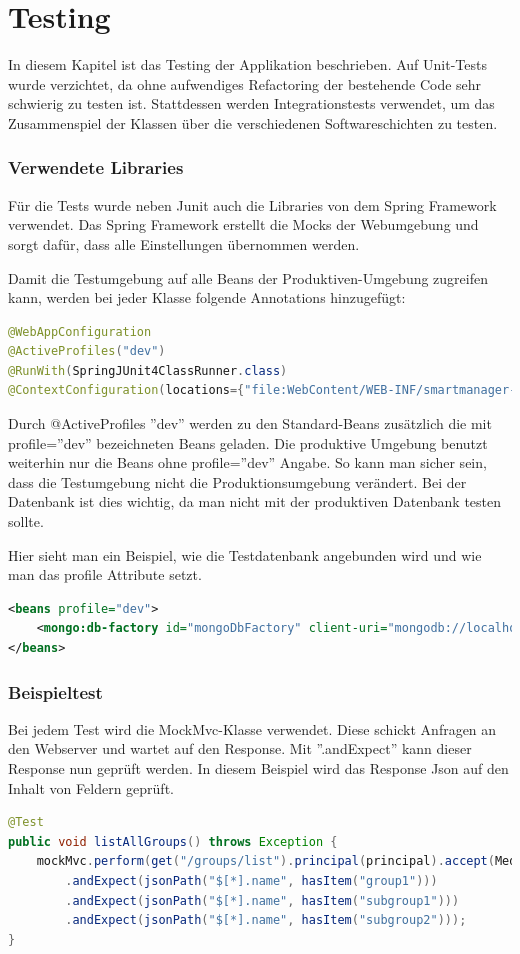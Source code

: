 \newpage
\section{Testing}
In diesem Kapitel ist das Testing der Applikation beschrieben. Auf Unit-Tests wurde verzichtet, da ohne aufwendiges Refactoring der bestehende Code sehr schwierig zu testen ist. Stattdessen werden Integrationstests verwendet, um das Zusammenspiel der Klassen über die verschiedenen Softwareschichten zu testen.

\subsubsection{Verwendete Libraries}
Für die Tests wurde neben Junit auch die Libraries von dem Spring Framework verwendet. Das Spring Framework erstellt die Mocks der Webumgebung und sorgt dafür, dass alle Einstellungen übernommen werden.

Damit die Testumgebung auf alle Beans der Produktiven-Umgebung zugreifen kann, werden bei jeder Klasse folgende Annotations hinzugefügt:
\begin{lstlisting}[language=java]
@WebAppConfiguration
@ActiveProfiles("dev")
@RunWith(SpringJUnit4ClassRunner.class)
@ContextConfiguration(locations={"file:WebContent/WEB-INF/smartmanager-servlet.xml"})
\end{lstlisting}

Durch @ActiveProfiles ''dev'' werden zu den Standard-Beans zusätzlich die mit profile=''dev'' bezeichneten Beans geladen. Die produktive Umgebung benutzt weiterhin nur die Beans ohne profile=''dev'' Angabe. So kann man sicher sein, dass die Testumgebung nicht die Produktionsumgebung verändert. Bei der Datenbank ist dies wichtig, da man nicht mit der produktiven Datenbank testen sollte.

Hier sieht man ein Beispiel, wie die Testdatenbank angebunden wird und wie man das profile Attribute setzt.
\begin{lstlisting}[language=xml]
<beans profile="dev">
	<mongo:db-factory id="mongoDbFactory" client-uri="mongodb://localhost/test" />
</beans>
\end{lstlisting}

\subsubsection{Beispieltest}
Bei jedem Test wird die MockMvc-Klasse verwendet. Diese schickt Anfragen an den Webserver und wartet auf den Response. Mit ''.andExpect'' kann dieser Response nun geprüft werden. In diesem Beispiel wird das Response Json auf den Inhalt von Feldern geprüft.
\begin{lstlisting}[language=java]
@Test
public void listAllGroups() throws Exception {
	mockMvc.perform(get("/groups/list").principal(principal).accept(MediaType.APPLICATION_JSON))
		.andExpect(jsonPath("$[*].name", hasItem("group1")))
		.andExpect(jsonPath("$[*].name", hasItem("subgroup1")))
		.andExpect(jsonPath("$[*].name", hasItem("subgroup2")));
}
\end{lstlisting}

